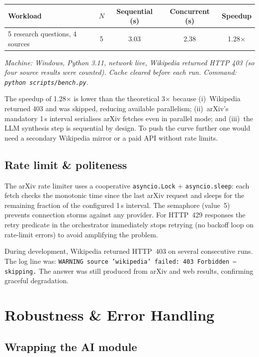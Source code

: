 \documentclass[11pt,a4paper]{article}
\begin{document}
\begin{center}\small
\begin{tabular}{lcccc}
\toprule
\textbf{Workload} & $N$ & \textbf{Sequential (s)} & \textbf{Concurrent (s)} & \textbf{Speedup} \\
\midrule
5 research questions, 4 sources & 5 & 3.03 & 2.38 & 1.28$\times$ \\
\bottomrule
\end{tabular}
\end{center}

\textit{Machine: Windows, Python 3.11, network live, Wikipedia returned HTTP 403 (so four source results were counted). Cache cleared before each run. Command: \texttt{python scripts/bench.py}.}

The speedup of 1.28$\times$ is lower than the theoretical 3$\times$ because (i)~Wikipedia returned 403 and was skipped, reducing available parallelism; (ii)~arXiv's mandatory 1\,s interval serialises arXiv fetches even in parallel mode; and (iii)~the LLM synthesis step is sequential by design. To push the curve further one would need a secondary Wikipedia mirror or a paid API without rate limits.

\subsection{Rate limit \& politeness}

The arXiv rate limiter uses a cooperative \texttt{asyncio.Lock} + \texttt{asyncio.sleep}: each fetch checks the monotonic time since the last arXiv request and sleeps for the remaining fraction of the configured 1\,s interval. The semaphore (value~5) prevents connection storms against any provider. For HTTP~429 responses the retry predicate in the orchestrator immediately stops retrying (no backoff loop on rate-limit errors) to avoid amplifying the problem.

During development, Wikipedia returned HTTP~403 on several consecutive runs. The log line was:
\texttt{WARNING source 'wikipedia' failed: 403 Forbidden -- skipping.} The answer was still produced from arXiv and web results, confirming graceful degradation.

\section{Robustness \& Error Handling}\label{sec:robustness}

\subsection{Wrapping the AI module}
\end{document}

